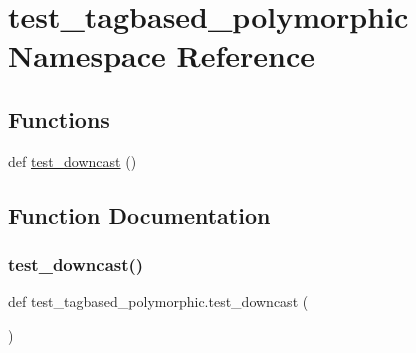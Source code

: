 \hypertarget{namespacetest__tagbased__polymorphic}{}\section{test\+\_\+tagbased\+\_\+polymorphic Namespace Reference}
\label{namespacetest__tagbased__polymorphic}
\subsection*{Functions}
\begin{DoxyCompactItemize}
\item 
def \mbox{\hyperlink{namespacetest__tagbased__polymorphic_adfaf40e3b1c506efa3d80218072957b6}{test\+\_\+downcast}} ()
\end{DoxyCompactItemize}


\subsection{Function Documentation}
\mbox{\label{namespacetest__tagbased__polymorphic_adfaf40e3b1c506efa3d80218072957b6}} 
\subsubsection{\texorpdfstring{test\_downcast()}{test\_downcast()}}
{\footnotesize\ttfamily def test\+\_\+tagbased\+\_\+polymorphic.\+test\+\_\+downcast (\begin{DoxyParamCaption}{ }\end{DoxyParamCaption})}

